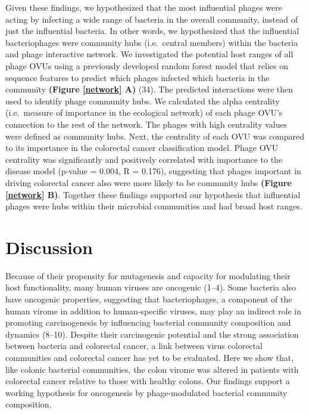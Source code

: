 \documentclass[12pt,]{article}
\begin{document}
Given these findings, we hypothesized that the most influential phages
were acting by infecting a wide range of bacteria in the overall
community, instead of just the influential bacteria. In other words, we
hypothesized that the influential bacteriophages were community hubs
(i.e.~central members) within the bacteria and phage interactive
network. We investigated the potential host ranges of all phage OVUs
using a previously developed random forest model that relies on sequence
features to predict which phages infected which bacteria in the
community \textbf{(Figure \ref{network} A)} (34). The predicted
interactions were then used to identify phage community hubs. We
calculated the alpha centrality (i.e.~measure of importance in the
ecological network) of each phage OVU's connection to the rest of the
network. The phages with high centrality values were defined as
community hubs. Next, the centrality of each OVU was compared to its
importance in the colorectal cancer classification model. Phage OVU
centrality was significantly and positively correlated with importance
to the disease model (p-value = 0.004, R = 0.176), suggesting that
phages important in driving colorectal cancer also were more likely to
be community hubs \textbf{(Figure \ref{network} B)}. Together these
findings supported our hypothesis that influential phages were hubs
within their microbial communities and had broad host ranges.

\section{Discussion}\label{discussion}

Because of their propensity for mutagenesis and capacity for modulating
their host functionality, many human viruses are oncogenic (1--4). Some
bacteria also have oncogenic properties, suggesting that bacteriophages,
a component of the human virome in addition to human-specific viruses,
may play an indirect role in promoting carcinogenesis by influencing
bacterial community composition and dynamics (8--10). Despite their
carcinogenic potential and the strong association between bacteria and
colorectal cancer, a link between virus colorectal communities and
colorectal cancer has yet to be evaluated. Here we show that, like
colonic bacterial communities, the colon virome was altered in patients
with colorectal cancer relative to those with healthy colons. Our
findings support a working hypothesis for oncogenesis by phage-modulated
bacterial community composition.
\end{document}
